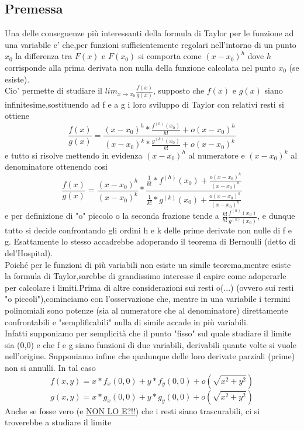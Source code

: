 \documentclass[fontsize = 20px, paper = a4]{article}
\begin{document}
\subsection{Premessa}
Una delle conseguenze più interessanti della formula di Taylor per le funzione ad una variabile e' che,per funzioni sufficientemente regolari nell'intorno di un punto $x_{0}$ la differenza tra $F(x)$ e $F(x_{0})$ si comporta come $(x-x_{0})^h$ dove $h$ corrisponde alla prima derivata non nulla della funzione calcolata nel punto $x_{0}$ (se esiste).\\
Cio' permette di studiare il $lim_{x \to x_{0}} \frac{f(x)}{g(x)}$, supposto che $f(x)$ e $g(x)$ siano infinitesime,sostituendo ad f e a g i loro sviluppo di Taylor con relativi resti si ottiene
$$\frac{f(x)}{g(x)}=\frac{(x-x_{0})^h *\frac{f^{(h)}(x_{0})}{h!}+o(x-x_{0})^h}{(x-x_{0})^k *\frac{g^{(k)}(x_{0})}{k!}+o(x-x_{0})^k}$$ e tutto si risolve mettendo in evidenza $(x-x_{0})^h$ al numeratore e $(x-x_{0})^k$ al denominatore ottenendo cosi
$$\frac{f(x)}{g(x)}=\frac{(x-x_{0})^h}{(x-x_{0})^k} * \frac{\frac{1}{h!}*f^{(h)}(x_{0}) + \frac{o(x-x_{0})^h}{(x-x_{0})^h}}{\frac{1}{k!}*g^{(k)}(x_{0}) + \frac{o(x-x_{0})^k}{(x-x_{0})^k}}$$
e per definizione di "o" piccolo o la seconda frazione tende a $\frac{k!}{h!}\frac{f^{(h)}(x_{0})}{g^{(k)}(x_{0})}$, e dunque tutto si decide confrontando gli ordini h e k delle prime derivate non nulle di f e g.
Esattamente lo stesso accadrebbe adoperando il teorema di Bernoulli (detto di del'Hospital).\\
Poiché per le funzioni di più variabili non esiste un simile teorema,mentre esiste la formula di Taylor,sarebbe di grandissimo interesse il capire come adoperarle per calcolare i limiti.Prima di altre considerazioni sui resti o(...) (ovvero sui resti "o piccoli"),cominciamo con l'osservazione che, mentre in una variabile i termini polinomiali sono potenze (sia al numeratore che al denominatore) direttamente confrontabili e "semplificabili" nulla di simile accade in più variabili.\\
Infatti supponiamo per semplicità che il punto "fisso" sul quale studiare il limite sia (0,0) e che f e g siano funzioni di due variabili, derivabili quante volte si vuole nell'origine. Supponiamo infine che qualunque delle loro derivate parziali (prime) non si annulli. In tal caso
$$f(x,y) = x*f_x(0,0) + y*f_y(0,0) + o(\sqrt{x^2 + y^2})$$
$$g(x,y) = x*g_x(0,0) + y*g_y(0,0) + o(\sqrt{x^2 + y^2})$$ 
Anche se fosse vero (e \underline{NON LO E?!!}) che i resti siano trascurabili, ci si troverebbe a studiare il limite 
\end{document}
